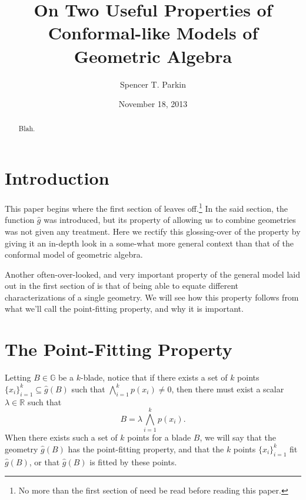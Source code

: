 \documentclass{birkjour}
\theoremstyle{definition}
\theoremstyle{remark}
\numberwithin{equation}{section}
\newcommand{\R}{\mathbb{R}}
\newcommand{\G}{\mathbb{G}}
\newcommand{\gh}{\hat{g}}
\begin{document}
\title{On Two Useful Properties of\\Conformal-like Models of\\Geometric Algebra}

\author{Spencer T. Parkin}
\address{102 W. 500 S., Salt Lake City, UT  84101}



\date{November 18, 2013}


\begin{abstract}
Blah.
\end{abstract}

\maketitle

\section{Introduction}

This paper begins where the first section of \cite{Parkin13} leaves off.\footnote{No more than
the first section of \cite{Parkin13} need be read before reading this paper.}  In the
said section, the function $\gh$ was introduced, but its property of allowing us
to combine geometries was not given any treatment.  Here we rectify this
glossing-over of the property by giving it an in-depth look in a some-what more general context
than that of the conformal model of geometric algebra.

Another often-over-looked, and very important
property of the general model laid out in the first section of \cite{Parkin13} is that
of being able to equate different characterizations of a single geometry.  We will see
how this property follows from what we'll call the point-fitting property, and why
it is important.

\section{The Point-Fitting Property}

Letting $B\in\G$ be a $k$-blade, notice that if
there exists a set of $k$ points $\{x_i\}_{i=1}^k\subseteq\gh(B)$ such that
$\bigwedge_{i=1}^k p(x_i)\neq 0$,
then there must exist a scalar $\lambda\in\R$ such that
\begin{equation*}
B = \lambda\bigwedge_{i=1}^k p(x_i).
\end{equation*}
When there exists such a set of $k$ points for a blade $B$,
we will say that the geometry $\gh(B)$ has the point-fitting
property, and that the $k$ points $\{x_i\}_{i=1}^k$ fit $\gh(B)$,
or that $\gh(B)$ is fitted by these points.
\end{document}
